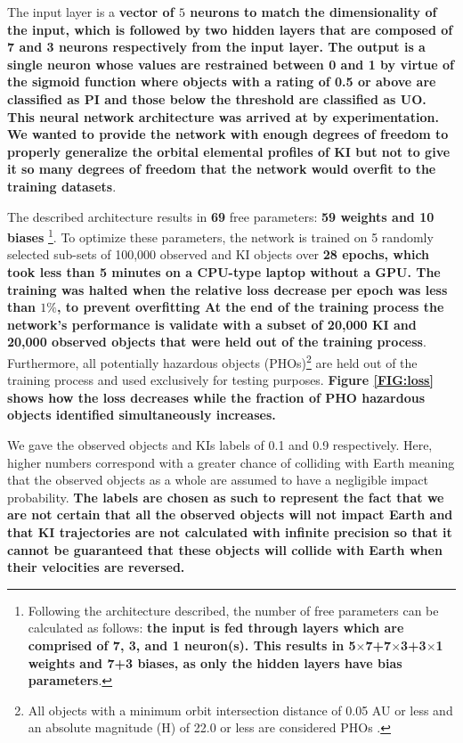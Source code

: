 \documentclass{aa}
\begin{document}
The input layer is a \textbf{vector of $5$ neurons to match the dimensionality of the input, which is followed by two hidden layers that are composed of 7 and 3 neurons respectively from the input layer. The output is a single neuron whose values are restrained between 0 and 1 by virtue of the sigmoid function where objects with a rating of 0.5 or above are classified as PI and those below the threshold are classified as UO.  This neural network architecture was arrived at by experimentation. We wanted to provide the network with enough degrees of freedom to properly generalize the orbital elemental profiles of KI but not to give it so many degrees of freedom that the network would overfit to the training datasets}.    
\par  
The described architecture results in \textbf{69} free parameters: \textbf{59 weights and 10 biases} \footnote{Following the architecture described, the number of free parameters can be calculated as follows: \textbf{the input is fed through layers which are comprised of 7, 3, and 1 neuron(s). This results in 5$\times$7+7$\times$3+3$\times$1 weights and 7+3 biases, as only the hidden layers have bias parameters}.}. To optimize these parameters, the network is trained on 5 randomly selected sub-sets of 100,000 observed and KI objects over \textbf{28 epochs, which took less than 5 minutes on a CPU-type laptop without a GPU. The training was halted when the relative loss decrease per epoch was less than $1\%$, to prevent overfitting At the end of the training process the network's performance is validate with a subset of 20,000 KI and 20,000 observed objects that were held out of the training process}. Furthermore, all potentially hazardous objects (PHOs)\footnote{All objects with a minimum orbit intersection distance of 0.05 AU or less and an absolute magnitude (H) of 22.0 or less are considered PHOs \citep{NasaPHA}.} are held out of the training process and used exclusively for testing purposes. \textbf{Figure \ref{FIG:loss} shows how the loss decreases while the fraction of PHO hazardous objects identified simultaneously increases.}
\par
We gave the observed objects and KIs labels of 0.1 and 0.9 respectively. Here, higher numbers correspond with a greater chance of colliding with Earth meaning that the observed objects as a whole are assumed to have a negligible impact probability. 
\textbf{The labels are chosen as such to represent the fact that we are not certain that all the observed objects will not impact Earth and that KI trajectories are not calculated with infinite precision so that it cannot be guaranteed that these objects will collide with Earth when their velocities are reversed.}  
\end{document}

